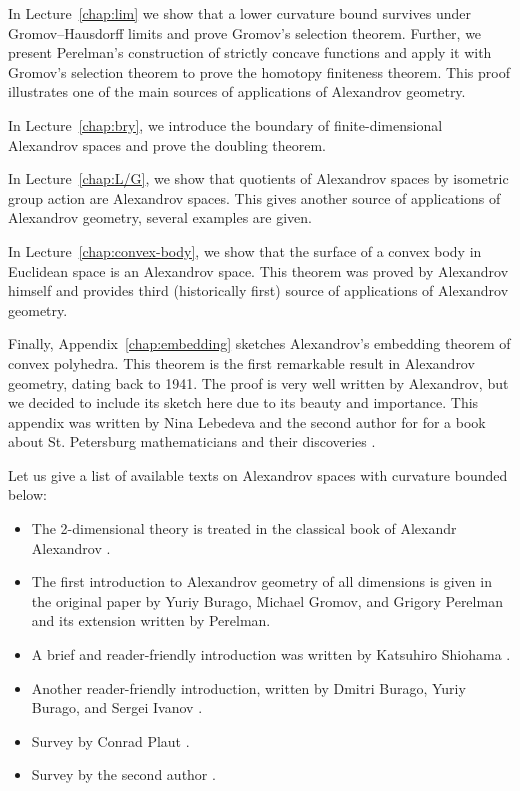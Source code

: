 In Lecture~\ref{chap:lim} we show that a lower curvature bound survives under Gromov--Hausdorff limits and prove Gromov's selection theorem.
Further, we present Perelman's construction of strictly concave functions and apply it with Gromov's selection theorem to prove the homotopy finiteness theorem.
This proof illustrates one of the main sources of applications of Alexandrov geometry.

In Lecture~\ref{chap:bry}, we introduce the boundary of finite-dimensional Alexandrov spaces and prove the doubling theorem.

In Lecture~\ref{chap:L/G}, we show that quotients of Alexandrov spaces by isometric group action are Alexandrov spaces.
This gives another source of applications of Alexandrov geometry, several examples are given.

In Lecture~\ref{chap:convex-body}, we show that the surface of a convex body in Euclidean space is an Alexandrov space.
This theorem was proved by Alexandrov himself and provides third (historically first) source of applications of Alexandrov geometry.

Finally, Appendix~\ref{chap:embedding} sketches Alexandrov's embedding theorem of convex polyhedra.
This theorem is the first remarkable result in Alexandrov geometry, dating back to 1941.
The proof is very well written by Alexandrov, but we decided to include its sketch here due to its beauty and importance.
This appendix was written by Nina Lebedeva and the second author for  for a book about St. Petersburg mathematicians and their discoveries \cite{lebedeva-petrunin2024a}.

Let us give a list of available texts on Alexandrov spaces with curvature bounded below: 
\begin{itemize}
\item The 2-dimensional theory is treated in the classical book of Alexandr Alexandrov \cite{alexandrov-1948}.
\item The first introduction to Alexandrov geometry of all dimensions is given in the original paper by Yuriy Burago, Michael Gromov, and Grigory Perelman \cite{burago-gromov-perelman} 
and its extension \cite{perelman1991} written by Perelman.
\item A brief and reader-friendly introduction was written by Katsuhiro Shiohama \cite[Sections 1--8]{shiohama}.
\item Another reader-friendly introduction, written by Dmitri Burago, Yuriy
Burago, and Sergei Ivanov \cite[Chapter 10]{burago-burago-ivanov}.
\item Survey by Conrad Plaut \cite{plaut:survey}.
\item Survey by the second author \cite{petrunin:survey}.
\end{itemize}


